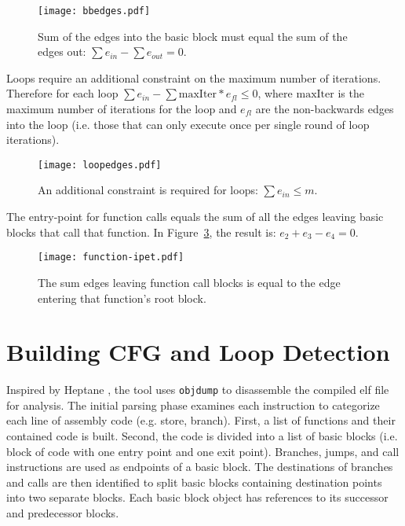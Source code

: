 \begin{figure}[h]
\centering
\texttt{[image: bbedges.pdf]}
\caption{Sum of the edges into the basic block must equal the sum of the edges out: $\sum e_{in} - \sum e_{out} = 0$.} 
\label{f:bbedges}
\end{figure}




Loops require an additional constraint on the maximum number of iterations. Therefore for each loop $\sum e_{in} - \sum \mathrm{maxIter}*e_{fl} \le 0$, where $\mathrm{maxIter}$ is the maximum number of iterations for the loop and $e_{fl}$ are the non-backwards edges into the loop (i.e. those that can only execute once per single round of loop iterations).


\begin{figure}[h]
\centering
\texttt{[image: loopedges.pdf]}
\caption{An additional constraint is required for loops: $\sum e_{in} \leq m$.} 
\label{f:loopedges}
\end{figure}


The entry-point for function calls equals the sum of all the edges leaving basic blocks that call that function. In Figure~\ref{f:function-ipet}, the result is: $e_2+e_3-e_4 = 0$. 

\begin{figure}[h]
\centering
\texttt{[image: function-ipet.pdf]}
\caption{The sum edges leaving function call blocks is equal to the edge entering that function's root block.} 
\label{f:function-ipet}
\end{figure}
 

\section{Building CFG and Loop Detection}
	Inspired by Heptane \cite{heptane}, the tool uses \texttt{objdump} to disassemble the compiled elf file for analysis. 
	The initial parsing phase examines each instruction to categorize each line of assembly code (e.g. store, branch). 
	First, a list of functions and their contained code is built. Second, the code is divided into a list of basic blocks (i.e. block of code with one entry point and one exit point). 
	Branches, jumps, and call instructions are used as endpoints of a basic block. 
	The destinations of branches and calls are then identified to split basic blocks containing destination points into two separate blocks. 
	Each basic block object has references to its successor and predecessor blocks.

